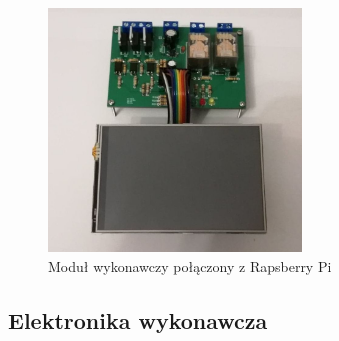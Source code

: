 \documentclass[12pt, eng, twoside, openany, final]{mgr}
\begin{document}
        \begin{figure}[H]
            \begin{center}
            \includegraphics[width=0.6\textwidth]{poloczona_zoom.jpg}
            \caption{Moduł wykonawczy połączony z Rapsberry Pi}
            \end{center}
        \end{figure}
        
        \newpage
        \subsection{Elektronika wykonawcza}
\end{document}
